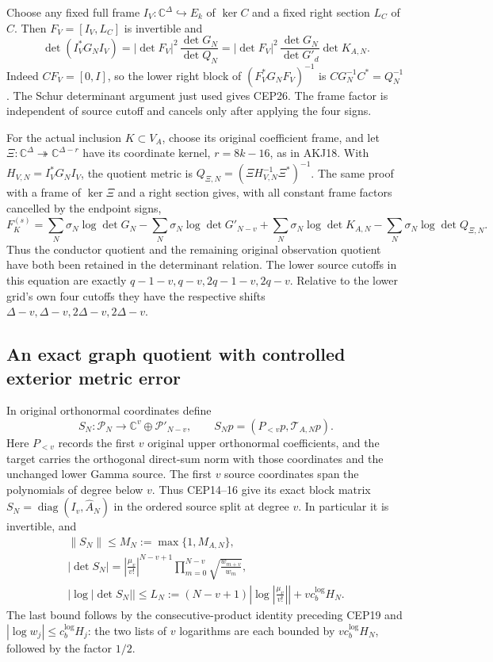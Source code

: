 \documentclass[11pt,a4paper]{article}
\begin{document}
Choose any fixed full frame $I_V:\mathbb C^\Delta\hookrightarrow E_k$
of $\ker C$ and a fixed right section $L_C$ of $C$.
Then $F_V=[I_V,L_C]$ is invertible and
\[
 \det(I_V^*G_NI_V)
   =|\det F_V|^2\,\frac{\det G_N}{\det Q_N}
   =|\det F_V|^2\,\frac{\det G_N}{\det G'_d}\det K_{A,N}.
 \tag{CEP26}
\]
Indeed $CF_V=[0,I]$, so the lower right block of
$(F_V^*G_NF_V)^{-1}$ is $CG_N^{-1}C^*=Q_N^{-1}$.
The Schur determinant argument just used gives CEP26.
The frame factor is independent of source cutoff and cancels
only after applying the four signs.

For the actual inclusion $K\subset V_A$, choose its original
coefficient frame, and let $\Xi:\mathbb C^\Delta\twoheadrightarrow
\mathbb C^{\Delta-r}$ have its coordinate kernel, $r=8k-16$,
as in AKJ18. With $H_{V,N}=I_V^*G_NI_V$, the quotient metric is
$Q_{\Xi,N}=(\Xi H_{V,N}^{-1}\Xi^*)^{-1}$.
The same proof with a frame of $\ker\Xi$ and a right section gives,
with all constant frame factors cancelled by the endpoint signs,
\[
 F_K^{(s)}
 =\sum_N\sigma_N\log\det G_N
   -\sum_N\sigma_N\log\det G'_{N-v}
   +\sum_N\sigma_N\log\det K_{A,N}
   -\sum_N\sigma_N\log\det Q_{\Xi,N}.
 \tag{CEP27}
\]
Thus the conductor quotient and the remaining original observation
quotient have both been retained in the determinant relation.
The lower source cutoffs in this equation are exactly
$q-1-v,q-v,2q-1-v,2q-v$. Relative to the lower grid's own
four cutoffs they have the respective shifts
$\Delta-v,\Delta-v,2\Delta-v,2\Delta-v$.

\subsection{An exact graph quotient with controlled exterior metric error}

In original orthonormal coordinates define
\[
 S_N:\mathcal P_N\longrightarrow
         \mathbb C^v\oplus\mathcal P'_{N-v},\qquad
 S_Np=(P_{<v}p,\mathcal T_{A,N}p).
 \tag{CEP28}
\]
Here $P_{<v}$ records the first $v$ original upper orthonormal
coefficients, and the target carries the orthogonal direct-sum norm
with those coordinates and the unchanged lower Gamma source.
The first $v$ source coordinates span the polynomials of degree
below $v$. Thus CEP14--16 give its exact block matrix
$S_N=\operatorname{diag}(I_v,\widehat A_N)$ in the ordered
source split at degree $v$. In particular it is invertible, and
\[
 \begin{gathered}
 \|S_N\|\le M_N:=\max\{1,M_{A,N}\},\\
 |\det S_N|=\left|\frac{\mu_v}{v!}\right|^{N-v+1}
              \prod_{m=0}^{N-v}\sqrt{\frac{w_{m+v}}{w_m}},\\
 |\log|\det S_N||
 \le L_N:=(N-v+1)\left|\log\left|\frac{\mu_v}{v!}\right|\right|
                      +v c_b^{\log}H_N .
 \end{gathered}\tag{CEP29}
\]
The last bound follows by the consecutive-product identity preceding
CEP19 and $|\log w_j|\le c_b^{\log}H_j$: the two lists of $v$
logarithms are each bounded by $v c_b^{\log}H_N$, followed by
the factor $1/2$.
\end{document}
